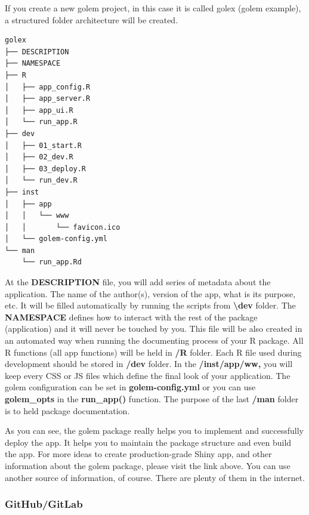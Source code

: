 \documentclass[
]{article}
\begin{document}
If you create a new golem project, in this case it is called golex
(golem example), a structured folder architecture will be created.

\begin{verbatim}
golex
├── DESCRIPTION
├── NAMESPACE
├── R
│   ├── app_config.R
│   ├── app_server.R
│   ├── app_ui.R
│   └── run_app.R
├── dev
│   ├── 01_start.R
│   ├── 02_dev.R
│   ├── 03_deploy.R
│   └── run_dev.R
├── inst
│   ├── app
│   │   └── www
│   │       └── favicon.ico
│   └── golem-config.yml
└── man
    └── run_app.Rd
\end{verbatim}

At the \textbf{DESCRIPTION} file, you will add series of metadata about
the application. The name of the author(s), version of the app, what is
its purpose, etc. It will be filled automatically by running the scripts
from \textbf{\textbackslash dev} folder. The \textbf{NAMESPACE} defines
how to interact with the rest of the package (application) and it will
never be touched by you. This file will be also created in an automated
way when running the documenting process of your R package. All R
functions (all app functions) will be held in \textbf{/R} folder. Each R
file used during development should be stored in \textbf{/dev} folder.
In the \textbf{/inst/app/ww,} you will keep every CSS or JS files which
define the final look of your application. The golem configuration can
be set in \textbf{golem-config.yml} or you can use \textbf{golem\_opts}
in the \textbf{run\_app()} function. The purpose of the last
\textbf{/man} folder is to held package documentation.

As you can see, the golem package really helps you to implement and
successfully deploy the app. It helps you to maintain the package
structure and even build the app. For more ideas to create
production-grade Shiny app, and other information about the golem
package, please visit the link above. You can use another source of
information, of course. There are plenty of them in the internet.

\hypertarget{githubgitlab}{%
\subsubsection{GitHub/GitLab}\label{githubgitlab}}
\end{document}
